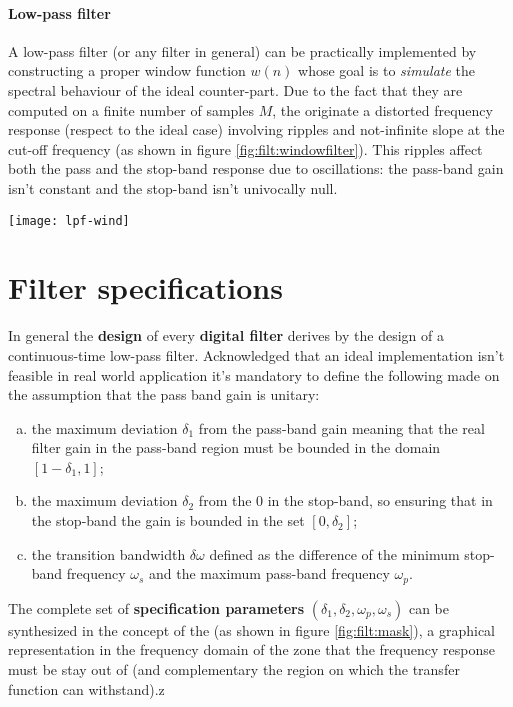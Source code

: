 	\paragraph{Low-pass filter} A low-pass filter (or any filter in general) can be practically implemented by constructing a proper window function $w(n)$ whose goal is to \textit{simulate} the spectral behaviour of the ideal counter-part. Due to the fact that they are computed on a finite number of samples $M$, the originate a distorted frequency response (respect to the ideal case) involving ripples and not-infinite slope at the cut-off frequency (as shown in figure \ref{fig:filt:windowfilter}). This ripples affect both the pass and the stop-band response due to oscillations: the pass-band gain isn't constant and the stop-band isn't univocally null.	
	
	\begin{SCfigure}[2][bht]
		\centering \texttt{[image: lpf-wind]}
		\caption{spectral behaviour of low pass filter realised by appropriate windows of length $M$.}
		\label{fig:filt:windowfilter}
	\end{SCfigure}

\section{Filter specifications}
	In general the \textbf{design} of every \textbf{digital filter} derives by the design of a continuous-time low-pass filter. Acknowledged that an ideal implementation isn't feasible in real world application it's mandatory to define the following  made on the assumption that the pass band gain is unitary:
	\begin{enumerate}[a)]
		\item the maximum deviation $\delta_1$ from the pass-band gain meaning that the real filter gain in the pass-band region must be bounded in the domain $[1-\delta_1,1]$;
		\item the maximum deviation $\delta_2$ from the 0 in the stop-band,  so ensuring that in the stop-band the gain is bounded in the set $[0,\delta_2]$;
		\item the transition bandwidth $\delta \omega$ defined as the difference of the minimum stop-band frequency $\omega_s$ and the maximum pass-band frequency $\omega_p$.
	\end{enumerate}
	
	The complete set of \textbf{specification parameters} $(\delta_1,\delta_2,\omega_p,\omega_s)$ can be synthesized in the concept of the  (as shown in figure \ref{fig:filt:mask}), a graphical representation in the frequency domain of the zone that the frequency response must be stay out of (and complementary the region on which the transfer function can withstand).z
	
